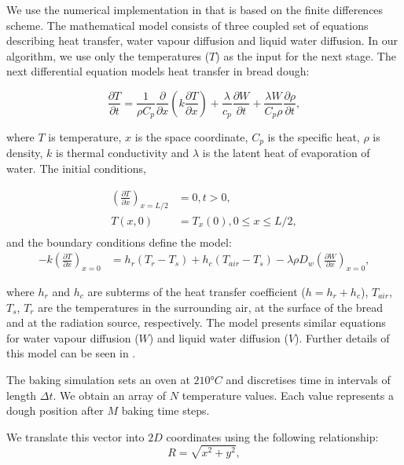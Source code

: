 \documentclass[final,5p,times]{elsarticle}
\begin{document}
We use the numerical implementation in \cite{Powathil2004} that is based on the finite differences scheme. The mathematical model consists of three coupled set of equations describing heat transfer, water vapour diffusion and liquid water diffusion. In our algorithm,  we use only the temperatures ($T$) as the input for the next stage. The next differential equation models heat transfer in bread dough:

\begin{equation}
\frac{\partial T}{\partial t} = \frac{1}{\rho C_{p}} \frac{\partial}{\partial x} \left ( k \frac{\partial T}{\partial x} \right ) + \frac{\lambda}{c_{p}} \frac{\partial W}{\partial t}+\frac{\lambda W}{ C_{p} \rho}\frac{\partial \rho}{\partial t},
\end{equation}


\noindent where $T$ is temperature, $x$ is the space coordinate, $C_{p}$ is the specific heat, $\rho$ is density, $k$ is thermal conductivity and $\lambda$ is the latent heat of evaporation of water. The initial conditions,

\begin{align}
\left ( \frac{\partial T}{\partial x} \right )_{x=L/2} &= 0 , t > 0, \\
T(x,0) &= T_{x}(0), 0\le x \le L/2,\\
\end{align}
and the boundary conditions define the model:
\begin{align}
-k \left ( \frac{\partial T}{\partial x} \right )_{x=0} &= h_{r}(T_{r}-T_{s}) + h_{c}(T_{air}-T_{s}) - \lambda \rho D_{w} \left (\frac{\partial W}{\partial x} \right )_{x=0},
\end{align}

\noindent where $h_{r}$ and $h_{c}$ are subterms of the heat transfer coefficient ($h = h_{r}+h_{c}$), $T_{air}$, $T_{s}$, $T_{r}$ are the temperatures in the surrounding air, at the surface of the bread and at the radiation source, respectively. The model presents similar equations for water vapour diffusion ($W$) and  liquid water diffusion ($V$). Further details of this model can be seen in \cite{Powathil2004}.

The baking simulation sets an oven at $210°C$ and discretises time in intervals of length $\Delta t$.  We obtain an array of $N$ temperature values. Each value represents a dough position after $M$ baking time steps.

We translate this vector into $2D$ coordinates using the following relationship:
\begin{equation}
R = \sqrt{x^{2}+y^{2}},
\end{equation}
\end{document}

